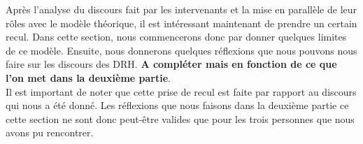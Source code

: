 Après l'analyse du discours fait par les intervenants et la mise en parallèle de leur rôles avec le modèle théorique, il est intéressant maintenant de prendre un certain recul. Dans cette section, nous commencerons donc par donner quelques limites de ce modèle. Ensuite, nous donnerons quelques  réflexions que nous pouvons nous faire sur les discours des DRH. \textbf{A compléter mais en fonction de ce que l'on met dans la deuxième partie}.\\

Il est important de noter que cette prise de recul est faite par rapport au discours qui nous a été donné. Les réflexions que nous faisons dans la deuxième partie ce cette section ne sont donc peut-être valides que pour les trois personnes que nous avons pu rencontrer. \\